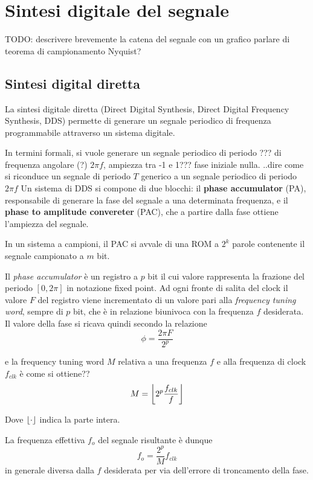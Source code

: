 \DeclarePairedDelimiter\floor{\lfloor}{\rfloor}

\chapter{Sintesi digitale del segnale}

TODO: descrivere brevemente la catena del segnale con un grafico
parlare di teorema di campionamento Nyquist?

\section{Sintesi digital diretta}
La sintesi digitale diretta (Direct Digital Synthesis, Direct Digital Frequency Synthesis, DDS) permette di generare un segnale periodico di frequenza programmabile attraverso un sistema digitale.

In termini formali, si vuole generare un segnale periodico di periodo ??? di frequenza angolare (?) $2\pi f$, ampiezza tra -1 e 1??? fase iniziale nulla.
..dire come si riconduce un segnale di periodo $T$ generico a un segnale
periodico di periodo $2\pi f$ 
Un sistema di DDS si compone di due blocchi: il \textbf{phase accumulator} (PA), responsabile di generare la fase del segnale a una determinata frequenza, e il \textbf{phase to amplitude convereter} (PAC), che a partire dalla fase ottiene l'ampiezza del segnale.

In un sistema a campioni, il PAC si avvale di una ROM a $2^{k}$ parole contenente il segnale campionato a $m$ bit.

Il \textit{phase accumulator} è un registro a $p$ bit il cui valore rappresenta la frazione del periodo $[0, 2\pi]$ in notazione fixed point. Ad ogni fronte di salita del clock il valore $F$ del registro viene incrementato di un valore pari alla \textit{frequency tuning word}, sempre di $p$ bit, che è in relazione biunivoca con la frequenza $f$ desiderata.
Il valore della fase si ricava quindi secondo la relazione
\[
\phi = \frac{2\pi F}{2^p}
\]

e la frequency tuning word $M$ relativa a una frequenza $f$ e alla frequenza di clock $f_{clk}$ è
come si ottiene??
\[
M = \floor*{2^p\frac{f_{clk}}{f}}
\]

Dove $\floor{\cdot}$ indica la parte intera.

La frequenza effettiva $f_{o}$ del segnale risultante è dunque
\[
f_{o} = \frac{2^p}{M} f_{clk}
\]
in generale diversa dalla $f$ desiderata per via dell'errore di troncamento della fase.

